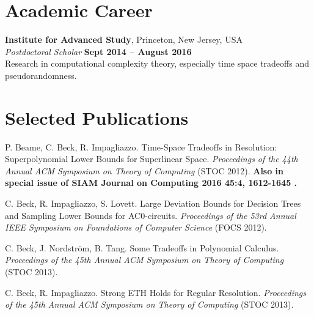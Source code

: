 \documentclass[margin,line]{resume}
\begin{document}
\begin{resume}

\section{\mysidestyle Academic Career}

    \textbf{Institute for Advanced Study}, Princeton, New Jersey, USA \vspace{2mm}\\\vspace{1mm}%
    \textsl{Postdoctoral Scholar} \hfill \textbf{Sept 2014 -- August 2016}\\
    Research in computational complexity theory, especially time space tradeoffs and pseudorandomness.

    \section{\mysidestyle Selected Publications}

    P. Beame, C. Beck, R. Impagliazzo. Time-Space Tradeoffs in Resolution: Superpolynomial Lower Bounds for Superlinear Space. \textsl{Proceedings of the 44th Annual ACM Symposium on Theory of Computing } (STOC 2012). {\bf Also in special issue of SIAM Journal on Computing 2016 45:4, 1612-1645 .}

\vspace{-2mm}
    C. Beck, R. Impagliazzo, S. Lovett. Large Deviation Bounds for Decision Trees and Sampling Lower Bounds for AC0-circuits. \textsl{Proceedings of the 53rd Annual IEEE Symposium on Foundations of Computer Science} (FOCS 2012). 

\vspace{-2mm}
    C. Beck, J. Nordstr{\"o}m, B. Tang. Some Tradeoffs in Polynomial Calculus. 
    \textsl{Proceedings of the 45th Annual ACM Symposium on Theory of Computing } (STOC 2013).

\vspace{-2mm}
    C. Beck, R. Impagliazzo. Strong ETH Holds for Regular Resolution.
    \textsl{Proceedings of the 45th Annual ACM Symposium on Theory of Computing } (STOC 2013).





\end{resume}
\end{document}
